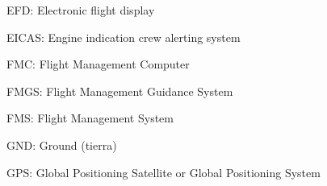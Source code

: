       EFD: Electronic flight display


      EICAS: Engine indication crew alerting system


	FMC: Flight Management Computer

	FMGS: Flight Management Guidance System

      FMS: Flight Management System




	GND: Ground (tierra)



    GPS: Global Positioning Satellite or Global Positioning System

